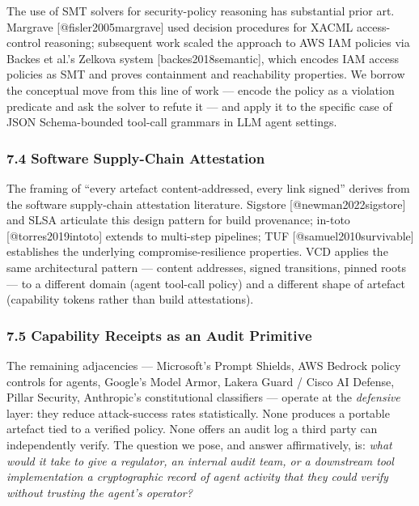 The use of SMT solvers for security-policy reasoning has substantial
prior art. Margrave {[}@fisler2005margrave{]} used decision procedures
for XACML access-control reasoning; subsequent work scaled the approach
to AWS IAM policies via Backes et al.'s Zelkova system
{[}backes2018semantic{]}, which encodes IAM access policies as SMT and
proves containment and reachability properties. We borrow the conceptual
move from this line of work --- encode the policy as a violation
predicate and ask the solver to refute it --- and apply it to the
specific case of JSON Schema-bounded tool-call grammars in LLM agent
settings.

\subsubsection{7.4 Software Supply-Chain
Attestation}\label{software-supply-chain-attestation}

The framing of ``every artefact content-addressed, every link signed''
derives from the software supply-chain attestation literature. Sigstore
{[}@newman2022sigstore{]} and SLSA articulate this design pattern for
build provenance; in-toto {[}@torres2019intoto{]} extends to multi-step
pipelines; TUF {[}@samuel2010survivable{]} establishes the underlying
compromise-resilience properties. VCD applies the same architectural
pattern --- content addresses, signed transitions, pinned roots --- to a
different domain (agent tool-call policy) and a different shape of
artefact (capability tokens rather than build attestations).

\subsubsection{7.5 Capability Receipts as an Audit
Primitive}\label{capability-receipts-as-an-audit-primitive}

The remaining adjacencies --- Microsoft's Prompt Shields, AWS Bedrock
policy controls for agents, Google's Model Armor, Lakera Guard / Cisco
AI Defense, Pillar Security, Anthropic's constitutional classifiers ---
operate at the \emph{defensive} layer: they reduce attack-success rates
statistically. None produces a portable artefact tied to a verified
policy. None offers an audit log a third party can independently verify.
The question we pose, and answer affirmatively, is: \emph{what would it
take to give a regulator, an internal audit team, or a downstream tool
implementation a cryptographic record of agent activity that they could
verify without trusting the agent's operator?}

